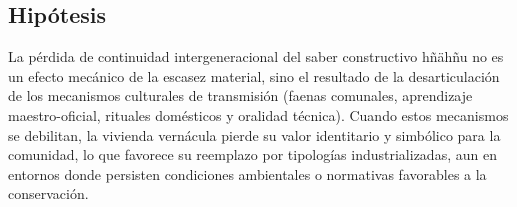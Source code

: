 \subsection{Hipótesis}

La pérdida de continuidad intergeneracional del saber constructivo hñähñu no es un efecto mecánico de la escasez material, sino el resultado de la desarticulación de los mecanismos culturales de transmisión (faenas comunales, aprendizaje maestro-oficial, rituales domésticos y oralidad técnica).  Cuando estos mecanismos se debilitan, la vivienda vernácula pierde su valor identitario y simbólico para la comunidad, lo que favorece su reemplazo por tipologías industrializadas, aun en entornos donde persisten condiciones ambientales o normativas favorables a la conservación.
